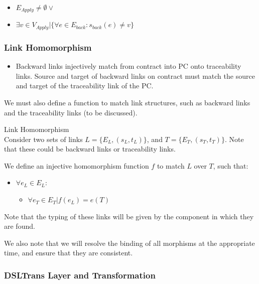\begin{itemize}
\item $E_{\textit{Apply}} \neq \emptyset \lor$
\item $ \exists v \in V_{\textit{Apply}} | \big\{\forall e \in E_{back}: s_{back}(e) \neq v \big\}$
\end{itemize}


\subsubsection{Link Homomorphism}

\begin{itemize}
\item Backward links injectively match from contract into PC onto traceability links. Source and target of backward links on contract must match the source and target of the traceability link of the PC.
\end{itemize}

We must also define a function to match link structures, such as backward links and the traceability links (to be discussed).

\begin{definition}{Link Homomorphism\\}
\label{def:link_homomorphism}
Consider two sets of links $L = \{E_{L}, (s_{L}, t_{L})\}$, and $T = \{E_{T}, (s_{T}, t_{T})\}$. Note that these could be backward links or traceability links.

We define an injective homomorphism function $f$ to match $L$ over $T$, such that:

\begin{itemize}
\item $\forall e_L \in E_L:$
\begin{itemize}
\item $\forall e_T \in E_T | f(e_L) = e(T)$
\end{itemize}
\end{itemize} 
\end{definition}

Note that the typing of these links will be given by the component in which they are found.

We also note that we will resolve the binding of all morphisms at the appropriate time, and ensure that they are consistent. 

\subsubsection*{DSLTrans Layer and Transformation}

